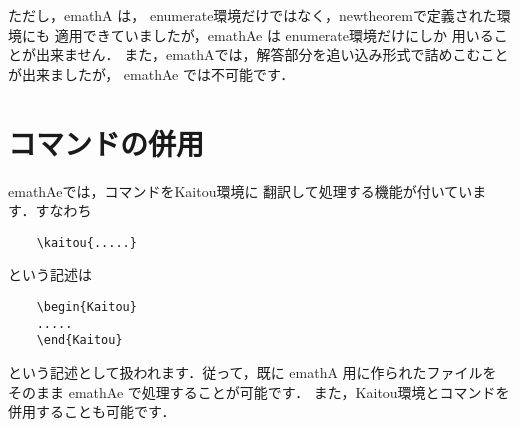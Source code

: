 \documentclass{jarticle}
\begin{document}
ただし，\textsf{emathA} は，
\textsf{enumerate}環境だけではなく，\textsf{newtheorem}で定義された環境にも
適用できていましたが，\textsf{emathAe} は \textsf{enumerate}環境だけにしか
用いることが出来ません．
また，\textsf{emathA}では，解答部分を追い込み形式で詰めこむことが出来ましたが，
\textsf{emathAe} では不可能です．

\section{コマンドの併用}
\textsf{emathAe}では，コマンドを\textsf{Kaitou}環境に
翻訳して処理する機能が付いています．すなわち
\begin{screen}
\begin{verbatim}
    \kaitou{.....}
\end{verbatim}
\end{screen}
という記述は
\begin{screen}
\begin{verbatim}
    \begin{Kaitou}
    .....
    \end{Kaitou}
\end{verbatim}
\end{screen}
という記述として扱われます．従って，既に \textsf{emathA} 用に作られたファイルを
そのまま \textsf{emathAe} で処理することが可能です．
また，\textsf{Kaitou}環境とコマンドを併用することも可能です．
\fi
\end{document}
